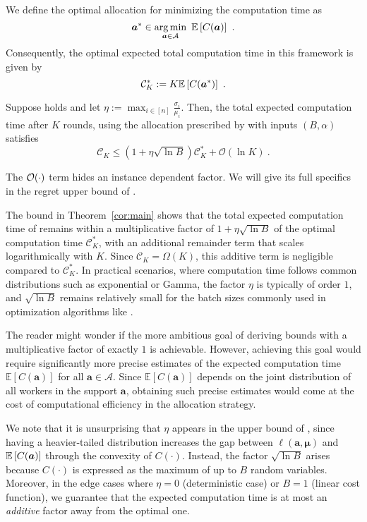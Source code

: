 We define the optimal allocation for minimizing the computation time as 
$$
\bm{a}^* \in \operatorname*{arg\,min}_{\bm{a} \in \mathcal{A}} \ \mathbb{E}\left[C(\bm{a})\right]~.
$$
Consequently, the optimal expected total computation time in this framework is given by 
$$
\mathcal{C}_K^{*} := K \mathbb{E}\left[C(\bm{a}^*)\right]~.
$$
\begin{theorem}
    \label{cor:main}
	Suppose  holds and let $\eta := \max_{i \in [n]} \frac{\sigma_i}{\mu_i}$.
	Then, the total expected computation time after $K$ rounds, using the allocation prescribed by  with inputs $(B, \alpha)$ satisfies
	$$
		\mathcal{C}_K \le \left(1+\eta\sqrt{\ln B}\right)\mathcal{C}_K^* + \mathcal{O}(\ln K)~.
	$$
\end{theorem}
\begin{remark}
	The $\mathcal{O}(\cdot)$ term hides an instance dependent factor. We will give its full specifics in the regret upper bound of .
\end{remark}

The bound in Theorem~\ref{cor:main} shows that the total expected computation time of  remains within a multiplicative factor of $1 + \eta \sqrt{\ln B}$ of the optimal computation time $\mathcal{C}_K^*$, with an additional remainder term that scales logarithmically with $K$. Since $\mathcal{C}_K = \Omega(K)$, this additive term is negligible compared to $\mathcal{C}^*_K$. In practical scenarios, where computation time follows common distributions such as exponential or Gamma, the factor $\eta$ is typically of order $1$, and $\sqrt{\ln B}$ remains relatively small for the batch sizes commonly used in optimization algorithms like .

The reader might wonder if the more ambitious goal of deriving bounds with a multiplicative factor of exactly $1$ is achievable. However, achieving this goal would require significantly more precise estimates of the expected computation time $\mathbb{E}[C(\bm{a})]$ for all $\bm{a} \in \mathcal{A}$. Since $\mathbb{E}[C(\bm{a})]$ depends on the joint distribution of all workers in the support $\bm{a}$, obtaining such precise estimates would come at the cost of computational efficiency in the allocation strategy.


We note that it is unsurprising that $\eta$ appears in the upper bound of , since having a heavier-tailed distribution increases the gap between $\ell(\bm{a}, \bm{\mu})$ and $\mathbb{E}\left[C(\bm{a})\right]$ through the convexity of $C(\cdot)$.
Instead, the factor $\sqrt{\ln B}$ arises because $C(\cdot)$ is expressed as the maximum of up to $B$ random variables.
Moreover, in the edge cases where $\eta = 0$ (deterministic case) or $B=1$ (linear cost function), we guarantee that the expected computation time is at most an \emph{additive} factor away from the optimal one.



